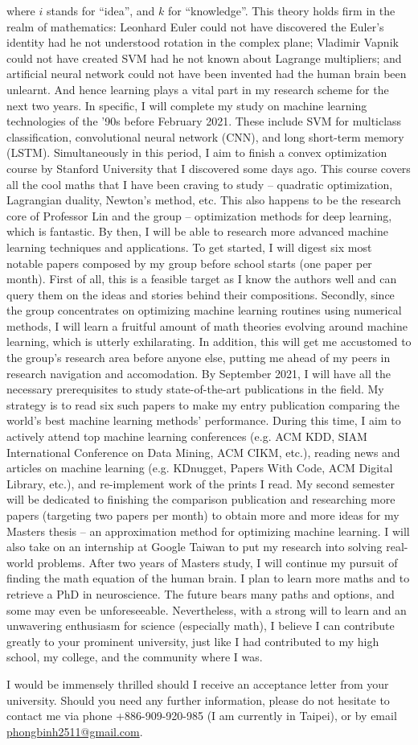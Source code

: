 \documentclass[letterpaper,12pt]{article}
\begin{document}
where \(i\) stands for ``idea'', and \(k\) for ``knowledge''. This theory holds firm in the realm of mathematics: Leonhard Euler could not have discovered the Euler's identity had he not understood rotation in the complex plane; Vladimir Vapnik could not have created SVM had he not known about Lagrange multipliers; and artificial neural network could not have been invented had the human brain been unlearnt. And hence learning plays a vital part in my research scheme for the next two years. In specific, I will complete my study on machine learning technologies of the '90s before February 2021. These include SVM for multiclass classification, convolutional neural network (CNN), and long short-term memory (LSTM). Simultaneously in this period, I aim to finish a convex optimization course by Stanford University that I discovered some days ago. This course covers all the cool maths that I have been craving to study -- quadratic optimization, Lagrangian duality, Newton's method, etc. This also happens to be the research core of Professor Lin and the group -- optimization methods for deep learning, which is fantastic. By then, I will be able to research more advanced machine learning techniques and applications. To get started, I will digest six most notable papers composed by my group before school starts (one paper per month). First of all, this is a feasible target as I know the authors well and can query them on the ideas and stories behind their compositions. Secondly, since the group concentrates on optimizing machine learning routines using numerical methods, I will learn a fruitful amount of math theories evolving around machine learning, which is utterly exhilarating. In addition, this will get me accustomed to the group's research area before anyone else, putting me ahead of my peers in research navigation and accomodation. By September 2021, I will have all the necessary prerequisites to study state-of-the-art publications in the field. My strategy is to read six such papers to make my entry publication comparing the world's best machine learning methods' performance. During this time, I aim to actively attend top machine learning conferences (e.g. ACM KDD, SIAM International Conference on Data Mining, ACM CIKM, etc.), reading news and articles on machine learning (e.g. KDnugget, Papers With Code, ACM Digital Library, etc.), and re-implement work of the prints I read. My second semester will be dedicated to finishing the comparison publication and researching more papers (targeting two papers per month) to obtain more and more ideas for my Masters thesis -- an approximation method for optimizing machine learning. I will also take on an internship at Google Taiwan to put my research into solving real-world problems. After two years of Masters study, I will continue my pursuit of finding the math equation of the human brain. I plan to learn more maths and to retrieve a PhD in neuroscience. The future bears many paths and options, and some may even be unforeseeable. Nevertheless, with a strong will to learn and an unwavering enthusiasm for science (especially math), I believe I can contribute greatly to your prominent university, just like I had contributed to my high school, my college, and the community where I was.

I would be immensely thrilled should I receive an acceptance letter from your university. Should you need any further information, please do not hesitate to contact me via phone +886-909-920-985 (I am currently in Taipei), or by email \href{mailto:phongbinh2511@gmail.com}{phongbinh2511@gmail.com}.
\end{document}
